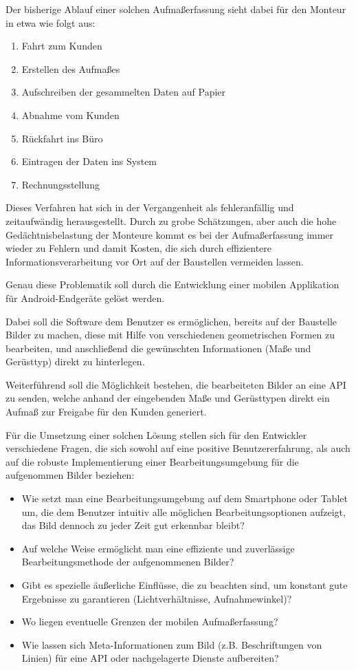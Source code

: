 Der bisherige Ablauf einer solchen Aufmaßerfassung sieht dabei für den Monteur in etwa wie folgt aus:

\begin{enumerate}
	\item Fahrt zum Kunden
	\item Erstellen des Aufmaßes
	\item Aufschreiben der gesammelten Daten auf Papier
	\item Abnahme vom Kunden
	\item Rückfahrt ins Büro
	\item Eintragen der Daten ins System
	\item Rechnungsstellung
\end{enumerate}

Dieses Verfahren hat sich in der Vergangenheit als fehleranfällig und zeitaufwändig herausgestellt. Durch zu grobe Schätzungen, aber auch die hohe Gedächtnisbelastung der Monteure kommt es bei der Aufmaßerfassung immer wieder zu Fehlern und damit Kosten, die sich durch effizientere Informationsverarbeitung vor Ort auf der Baustellen vermeiden lassen. 


Genau diese Problematik soll durch die Entwicklung einer mobilen Applikation für Android-Endgeräte gelöst werden.

Dabei soll die Software dem Benutzer es ermöglichen, bereits auf der Baustelle Bilder zu machen, diese mit Hilfe von verschiedenen geometrischen Formen zu bearbeiten, und anschließend die gewünschten Informationen (Maße und Gerüsttyp) direkt zu hinterlegen.

Weiterführend soll die Möglichkeit bestehen, die bearbeiteten Bilder an eine API zu senden, welche anhand der eingebenden Maße und Gerüsttypen direkt ein Aufmaß zur Freigabe für den Kunden generiert.

Für die Umsetzung einer solchen Lösung stellen sich für den Entwickler verschiedene Fragen, die sich sowohl auf eine positive Benutzererfahrung, als auch auf die robuste Implementierung einer Bearbeitungsumgebung für die aufgenommen Bilder beziehen:

\begin{itemize}
	\item Wie setzt man eine Bearbeitungsumgebung auf dem Smartphone oder Tablet um, die dem Benutzer intuitiv alle möglichen Bearbeitungsoptionen aufzeigt, das Bild dennoch zu jeder Zeit gut erkennbar bleibt?
	\item Auf welche Weise ermöglicht man eine effiziente und zuverlässige Bearbeitungsmethode der aufgenommenen Bilder?
	\item Gibt es spezielle äußerliche Einflüsse, die zu beachten sind, um konstant gute Ergebnisse zu garantieren (Lichtverhältnisse, Aufnahmewinkel)?
	\item Wo liegen eventuelle Grenzen der mobilen Aufmaßerfassung?
	\item Wie lassen sich Meta-Informationen zum Bild (z.B. Beschriftungen von Linien) für eine API oder nachgelagerte Dienste aufbereiten?
\end{itemize}

